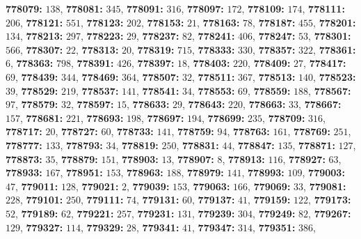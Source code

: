 \textsf{\bfseries 778079:} $138$, \textsf{\bfseries 778081:} $345$, \textsf{\bfseries 778091:} $316$, \textsf{\bfseries 778097:} $172$, \textsf{\bfseries 778109:} $174$, \textsf{\bfseries 778111:} $206$, \textsf{\bfseries 778121:} $551$, \textsf{\bfseries 778123:} $202$, \textsf{\bfseries 778153:} $21$, \textsf{\bfseries 778163:} $78$, \textsf{\bfseries 778187:} $455$, \textsf{\bfseries 778201:} $134$, \textsf{\bfseries 778213:} $297$, \textsf{\bfseries 778223:} $29$, \textsf{\bfseries 778237:} $82$, \textsf{\bfseries 778241:} $406$, \textsf{\bfseries 778247:} $53$, \textsf{\bfseries 778301:} $566$, \textsf{\bfseries 778307:} $22$, \textsf{\bfseries 778313:} $20$, \textsf{\bfseries 778319:} $715$, \textsf{\bfseries 778333:} $330$, \textsf{\bfseries 778357:} $322$, \textsf{\bfseries 778361:} $6$, \textsf{\bfseries 778363:} $798$, \textsf{\bfseries 778391:} $426$, \textsf{\bfseries 778397:} $18$, \textsf{\bfseries 778403:} $220$, \textsf{\bfseries 778409:} $27$, \textsf{\bfseries 778417:} $69$, \textsf{\bfseries 778439:} $344$, \textsf{\bfseries 778469:} $364$, \textsf{\bfseries 778507:} $32$, \textsf{\bfseries 778511:} $367$, \textsf{\bfseries 778513:} $140$, \textsf{\bfseries 778523:} $39$, \textsf{\bfseries 778529:} $219$, \textsf{\bfseries 778537:} $141$, \textsf{\bfseries 778541:} $34$, \textsf{\bfseries 778553:} $69$, \textsf{\bfseries 778559:} $188$, \textsf{\bfseries 778567:} $97$, \textsf{\bfseries 778579:} $32$, \textsf{\bfseries 778597:} $15$, \textsf{\bfseries 778633:} $29$, \textsf{\bfseries 778643:} $220$, \textsf{\bfseries 778663:} $33$, \textsf{\bfseries 778667:} $157$, \textsf{\bfseries 778681:} $221$, \textsf{\bfseries 778693:} $198$, \textsf{\bfseries 778697:} $194$, \textsf{\bfseries 778699:} $235$, \textsf{\bfseries 778709:} $316$, \textsf{\bfseries 778717:} $20$, \textsf{\bfseries 778727:} $60$, \textsf{\bfseries 778733:} $141$, \textsf{\bfseries 778759:} $94$, \textsf{\bfseries 778763:} $161$, \textsf{\bfseries 778769:} $251$, \textsf{\bfseries 778777:} $133$, \textsf{\bfseries 778793:} $34$, \textsf{\bfseries 778819:} $250$, \textsf{\bfseries 778831:} $44$, \textsf{\bfseries 778847:} $135$, \textsf{\bfseries 778871:} $127$, \textsf{\bfseries 778873:} $35$, \textsf{\bfseries 778879:} $151$, \textsf{\bfseries 778903:} $13$, \textsf{\bfseries 778907:} $8$, \textsf{\bfseries 778913:} $116$, \textsf{\bfseries 778927:} $63$, \textsf{\bfseries 778933:} $167$, \textsf{\bfseries 778951:} $153$, \textsf{\bfseries 778963:} $188$, \textsf{\bfseries 778979:} $141$, \textsf{\bfseries 778993:} $109$, \textsf{\bfseries 779003:} $47$, \textsf{\bfseries 779011:} $128$, \textsf{\bfseries 779021:} $2$, \textsf{\bfseries 779039:} $153$, \textsf{\bfseries 779063:} $166$, \textsf{\bfseries 779069:} $33$, \textsf{\bfseries 779081:} $228$, \textsf{\bfseries 779101:} $250$, \textsf{\bfseries 779111:} $74$, \textsf{\bfseries 779131:} $60$, \textsf{\bfseries 779137:} $41$, \textsf{\bfseries 779159:} $122$, \textsf{\bfseries 779173:} $52$, \textsf{\bfseries 779189:} $62$, \textsf{\bfseries 779221:} $257$, \textsf{\bfseries 779231:} $131$, \textsf{\bfseries 779239:} $304$, \textsf{\bfseries 779249:} $82$, \textsf{\bfseries 779267:} $129$, \textsf{\bfseries 779327:} $114$, \textsf{\bfseries 779329:} $28$, \textsf{\bfseries 779341:} $41$, \textsf{\bfseries 779347:} $314$, \textsf{\bfseries 779351:} $386$, 
